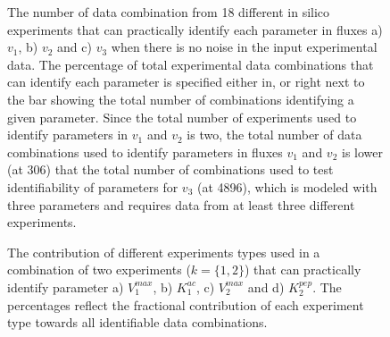\documentclass[10pt]{article}
\begin{document}
	\begin{figure}[!tbhp]
		\caption{The number of data combination from 18 different in silico experiments that can practically identify each parameter in fluxes a) $v_1$, b) $v_2$ and c) $v_3$ when there is no noise in the input experimental data. The percentage of total experimental data combinations that can identify each parameter is specified either in, or right next to the bar showing the total number of combinations identifying a given parameter. Since the total number of experiments used to identify parameters in $v_1$ and $v_2$ is two, the total number of data combinations used to identify parameters in fluxes $v_1$ and $v_2$ is lower (at 306) that the total number of combinations used to test identifiability of parameters for $v_3$ (at 4896), which is modeled with three parameters and requires data from at least three different experiments.}\label{fig:figure1}
	\end{figure}

	\begin{figure}[!tbhp]
		\caption{The contribution of different experiments types used in a combination of two experiments ($k = \{1, 2\}$) that can practically identify parameter a) $V_1^{max}$, b) $K_1^{ac}$, c) $V_2^{max}$ and d) $K_2^{pep}$. The percentages reflect the fractional contribution of each experiment type towards all identifiable data combinations.}\label{fig:figure2}
	\end{figure} 
	
\end{document}
